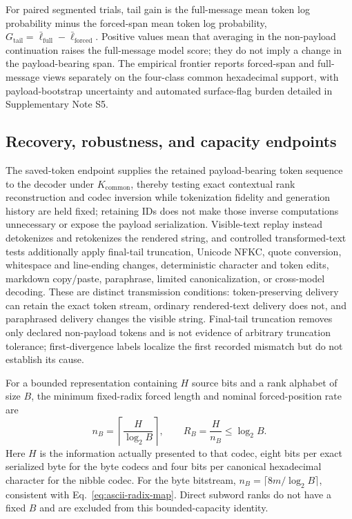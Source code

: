 \documentclass[fleqn,10pt]{wlscirep}
\begin{document}
For paired segmented trials, tail gain is the full-message mean token log probability minus the forced-span mean token log probability, \(G_{\mathrm{tail}}=\bar\ell_{\mathrm{full}}-\bar\ell_{\mathrm{forced}}\). Positive values mean that averaging in the non-payload continuation raises the full-message model score; they do not imply a change in the payload-bearing span. The empirical frontier reports forced-span and full-message views separately on the four-class common hexadecimal support, with payload-bootstrap uncertainty and automated surface-flag burden detailed in Supplementary Note S5.

\subsection*{Recovery, robustness, and capacity endpoints}\label{sec:replay-method}\label{sec:capacity-method}\label{sec:endpoint-method}

The saved-token endpoint supplies the retained payload-bearing token sequence to the decoder under \(K_{\mathrm{common}}\), thereby testing exact contextual rank reconstruction and codec inversion while tokenization fidelity and generation history are held fixed; retaining IDs does not make those inverse computations unnecessary or expose the payload serialization. Visible-text replay instead detokenizes and retokenizes the rendered string, and controlled transformed-text tests additionally apply final-tail truncation, Unicode NFKC, quote conversion, whitespace and line-ending changes, deterministic character and token edits, markdown copy/paste, paraphrase, limited canonicalization, or cross-model decoding\cite{YanMurawaki2025TokenizationInconsistency}. These are distinct transmission conditions: token-preserving delivery can retain the exact token stream, ordinary rendered-text delivery does not, and paraphrased delivery changes the visible string. Final-tail truncation removes only declared non-payload tokens and is not evidence of arbitrary truncation tolerance; first-divergence labels localize the first recorded mismatch but do not establish its cause.


For a bounded representation containing \(H\) source bits and a rank alphabet of size \(B\), the minimum fixed-radix forced length and nominal forced-position rate are
\begin{equation}
n_B=\left\lceil\frac{H}{\log_2B}\right\rceil,
\qquad
R_B=\frac{H}{n_B}\le\log_2B.
\label{eq:capacity}
\end{equation}
Here \(H\) is the information actually presented to that codec, eight bits per exact serialized byte for the byte codecs and four bits per canonical hexadecimal character for the nibble codec. For the byte bitstream, \(n_B=\lceil8m/\log_2B\rceil\), consistent with Eq.~\eqref{eq:ascii-radix-map}. Direct subword ranks do not have a fixed \(B\) and are excluded from this bounded-capacity identity.
\end{document}
